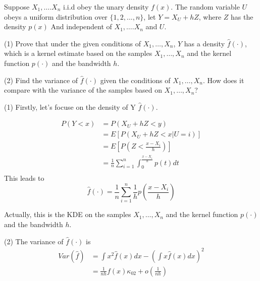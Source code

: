 \begin{problem}[HW 10.2]
Suppose $X_1,\ldots.X_n$ i.i.d obey the unary density $f(x)$. The random variable $U$ obeys a uniform distribution over $\{1,2,...,n\}$, let $Y=X_U+hZ$, where $Z$ has the density $p(x)$ And independent of $X_1,\ldots.X_n$ and $U$.

(1) Prove that under the given conditions of $X_1, \dots,X_n$, $Y$ has a density $\hat{f}(\cdot)$, which is a kernel estimate based on the samples $X_1, \dots,X_n$ and the kernel function $p(\cdot)$ and the bandwidth $h$.

(2) Find the variance of $\hat{f}(\cdot)$ given the conditions of $X_1, \dots,X_n$. 
How does it compare with the variance of the samples based on $X_1, \dots,X_n$?

\end{problem}

\begin{solution}
    (1) Firstly, let's focuse on the density of Y $\hat{f}(\cdot)$.

    \begin{equation*}
        \begin{split}
            P(Y < x) & = P(X_U + hZ < y) \\
            & = E\left[ P(X_U + hZ < x | U = i) \right] \\
            & = E \left[ P(Z < \frac{x-X_i}{h}) \right] \\
            & = \frac{1}{n} \sum_{i=1}^n \int_0^{\frac{x-X_i}{h}} p(t) dt \\
        \end{split}
    \end{equation*}
    This leads to 
    \begin{equation*}
        \hat{f}(\cdot) = \frac{1}{n} \sum_{i=1}^n \frac{1}{h} p\left( \frac{x-X_i}{h} \right) 
    \end{equation*}

    Actually, this is the KDE on the samples $X_1, \dots,X_n$ and the kernel function $p(\cdot)$ and the bandwidth $h$.
    
    (2) The variance of $\hat{f}(\cdot)$ is
    \begin{equation*}
        \begin{split}
            Var(\hat{f}) & = \int x^2 \hat{f}(x) dx - \left( \int x\hat{f}(x) dx \right)^2 \\
            & =\frac{1}{nh} f(x) \kappa_{02} + o(\frac{1}{nh}) \\
        \end{split}
    \end{equation*}
\end{solution}